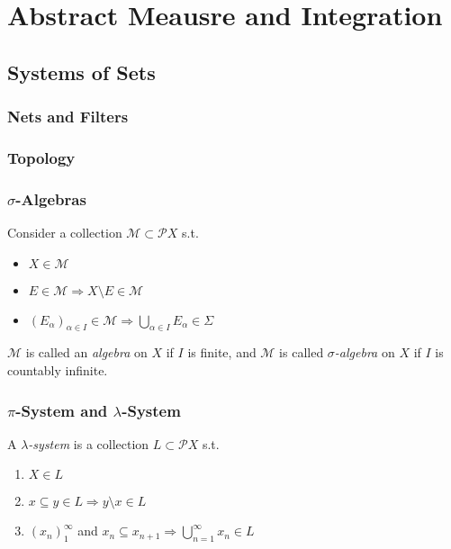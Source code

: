 \part{Abstract Meausre and Integration}


\chapter{Systems of Sets}

\section{Nets and Filters}

\section{Topology}

\section{\texorpdfstring{\(\sigma\)}{sigma}-Algebras}

\begin{definition}
    Consider a collection \( \mathcal{M} \subset \mathcal{P}X \) s.t.
    \begin{itemize}
        \item \( X \in \mathcal{M} \)
        \item \( E \in \mathcal{M} \Rightarrow X \setminus E \in \mathcal{M} \)
        \item \( \left( E_\alpha \right)_{\alpha \in I} \in \mathcal{M} \Rightarrow \bigcup_{\alpha \in I} E_{\alpha} \in \Sigma \) 
    \end{itemize}
    \(\mathcal{M}\) is called an \emph{algebra} on \(X\) if \(I\) is finite, and \(\mathcal{M}\) is called \emph{\(\sigma\)-algebra} on \(X\) if \(I\) is countably infinite.
\end{definition}

\section{\texorpdfstring{\(\pi\)}{pi}-System and \texorpdfstring{\(\lambda\)}{lambda}-System}

\begin{definition}
    A \emph{\(\lambda\)-system} is a collection \(L \subset \mathcal{P}X\) s.t.
    \begin{enumerate}
        \item \(X \in L\)
        \item \(x\subseteq y \in L \Rightarrow y\setminus x \in L\)
        \item \(\left( x_n  \right)_1^\infty \) and \(x_{n} \subseteq x_{n+1} \Rightarrow \bigcup_{n=1}^{\infty} x_n \in L \) 
    \end{enumerate}
\end{definition}


